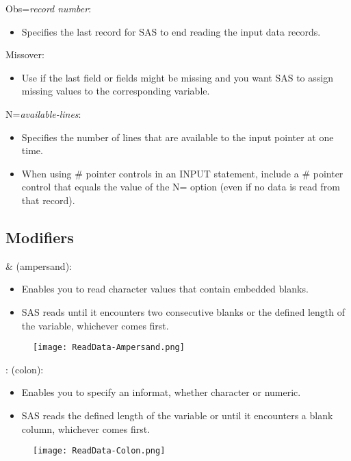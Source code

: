 \documentclass[11pt, oneside]{article}
\begin{document}
Obs=\textit{record number}:
\begin{itemize}
\item Specifies the last record for SAS to end reading the input data records.
\end{itemize}

Missover:
\begin{itemize}
\item Use if the last field or fields might be missing and you want SAS to assign missing values to the corresponding variable.
\end{itemize}

N=\textit{available-lines}:
\begin{itemize}
\item Specifies the number of lines that are available to the input pointer at one time.
\item When using \# pointer controls in an INPUT statement, include a \# pointer control that equals the value of the N= option (even if no data is read from that record).
\end{itemize}
    
\subsection{Modifiers}

\& (ampersand):
\begin{itemize}
\item Enables you to read character values that contain embedded blanks.
\item SAS reads until it encounters two consecutive blanks or the defined length of the variable, whichever comes first.
\end{itemize}

\begin{figure}[H]
\texttt{[image: ReadData-Ampersand.png]}
\end{figure}

: (colon):
\begin{itemize}
\item Enables you to specify an informat, whether character or numeric.
\item SAS reads the defined length of the variable or until it encounters a blank column, whichever comes first.
\end{itemize}

\begin{figure}[H]
\texttt{[image: ReadData-Colon.png]}
\end{figure}
\end{document}
